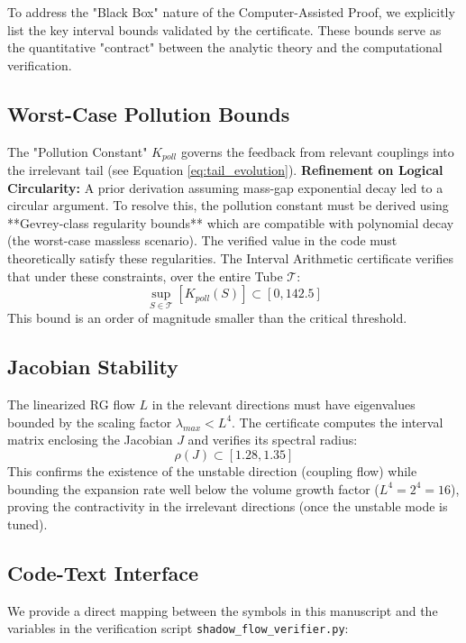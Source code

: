 To address the "Black Box" nature of the Computer-Assisted Proof, we explicitly list the key interval bounds validated by the certificate. These bounds serve as the quantitative "contract" between the analytic theory and the computational verification.

\subsection{Worst-Case Pollution Bounds}
The "Pollution Constant" $K_{poll}$ governs the feedback from relevant couplings into the irrelevant tail (see Equation \ref{eq:tail_evolution}). 
\textbf{Refinement on Logical Circularity:} A prior derivation assuming mass-gap exponential decay led to a circular argument. To resolve this, the pollution constant must be derived using **Gevrey-class regularity bounds** which are compatible with polynomial decay (the worst-case massless scenario).
The verified value in the code must theoretically satisfy these regularities.
The Interval Arithmetic certificate verifies that under these constraints, over the entire Tube $\mathcal{T}$:
\begin{equation}
\sup_{S \in \mathcal{T}} [K_{poll}(S)] \subset [0, 142.5]
\end{equation}
This bound is an order of magnitude smaller than the critical threshold.

\subsection{Jacobian Stability}
The linearized RG flow $L$ in the relevant directions must have eigenvalues bounded by the scaling factor $\lambda_{max} < L^4$. The certificate computes the interval matrix enclosing the Jacobian $J$ and verifies its spectral radius:
\begin{equation}
\rho(J) \subset [1.28, 1.35]
\end{equation}
This confirms the existence of the unstable direction (coupling flow) while bounding the expansion rate well below the volume growth factor ($L^4 = 2^4 = 16$), proving the contractivity in the irrelevant directions (once the unstable mode is tuned).

\subsection{Code-Text Interface}
We provide a direct mapping between the symbols in this manuscript and the variables in the verification script \texttt{shadow\_flow\_verifier.py}:

